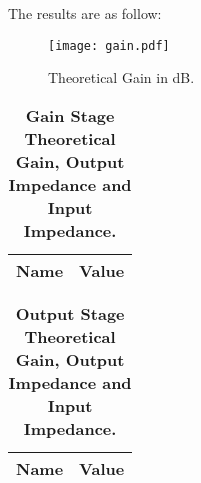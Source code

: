 The results are as follow:

\begin{figure}[h] 
\centering
\texttt{[image: gain.pdf]}
\caption{Theoretical Gain in dB.}
\label{Fig2: TheoGaindB}
\end{figure}

\begin{table}[H]
\centering
\begin{tabular}{|l|l|}
\hline
{\bf Name} & {\bf Value} \\ \hline
    
\end{tabular}
\caption{\textbf{Gain Stage Theoretical Gain, Output Impedance and Input Impedance.}}
\end{table}

\begin{table}[H]
\centering
\begin{tabular}{|l|l|}
\hline
{\bf Name} & {\bf Value} \\ \hline
    
\end{tabular}
\caption{\textbf{Output Stage Theoretical Gain, Output Impedance and Input Impedance.}}
\end{table}
